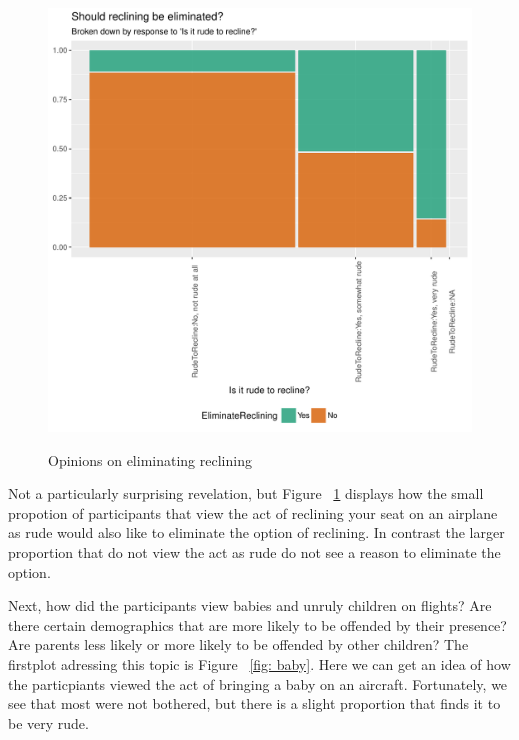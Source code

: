 \documentclass[DIV=calc, paper=a4, fontsize=10pt, twocolumn]{scrartcl}	 %
\begin{document}
\begin{figure}[h!]
\caption{Opinions on eliminating reclining}
\centering
\includegraphics{flying-eliminate}
\label{fig: eliminate}
\end{figure}

\par Not a particularly surprising revelation, but Figure ~\ref{fig: eliminate} displays how the small propotion of participants that view the act of reclining your seat on an airplane as rude would also like to eliminate the option of reclining. In contrast the larger proportion that do not view the act as rude do not see a reason to eliminate the option.


\par Next, how did the participants view babies and unruly children on flights? Are there certain demographics that are more likely to be offended by their presence? Are parents less likely or more likely to be offended by other children? The firstplot adressing this topic is Figure ~\ref{fig: baby}. Here we can get an idea of how the particpiants viewed the act of bringing a baby on an aircraft. Fortunately, we see that most were not bothered, but there is a slight proportion that finds it to be very rude.
\end{document}
